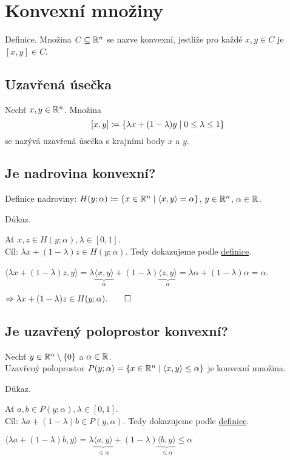 \section{Konvexní množiny} \label{sec:konvex}
Definice. Množina $C \subseteq \mathbb{R}^n$ se nazve konvexní, jestliže pro každé $x, y \in C$ je $[x,y] \in C$.

\subsection{Uzavřená úsečka}
Nechť $x, y \in \mathbb{R}^n$. Množina
\[ [x,y] \coloneq \left\lbrace \lambda x + (1-\lambda)y \mid 0 \leq \lambda \leq 1 \right\rbrace \]
se nazývá uzavřená úsečka s krajními body $x$ a $y$.

\subsection{Je nadrovina konvexní?}
Definice nadroviny: $H(y; \alpha) \coloneq \left\lbrace x \in \mathbb{R}^n \mid \langle x, y \rangle = \alpha \right\rbrace$, $y \in \mathbb{R}^n$, 
$\alpha \in \mathbb{R}$.

Důkaz.

Ať $x,z \in H(y; \alpha), \lambda \in [0,1]$.\\
Cíl: $\lambda x + (1-\lambda) z \in H(y; \alpha)$. Tedy dokazujeme podle \hyperref[sec:konvex]{definice}.

$\langle \lambda x + (1-\lambda)z, y \rangle = \lambda \underbrace{\langle x,y \rangle}_{\alpha} + (1-\lambda)
\underbrace{\langle z,y \rangle}_{\alpha} = \lambda \alpha + (1-\lambda) \alpha = \alpha$.

$\Rightarrow \lambda x + (1-\lambda)z \in H(y; \alpha). \qed$

\subsection{Je uzavřený poloprostor konvexní?}
Nechť $y \in \mathbb{R}^n \setminus \left\lbrace 0 \right\rbrace$ a $\alpha \in \mathbb{R}$. \\ Uzavřený poloprostor 
$P(y; \alpha) = \left\lbrace x \in \mathbb{R}^n \mid \langle x, y\rangle \leq \alpha \right\rbrace$ je konvexní množina.

Důkaz.

Ať $a,b \in P(y; \alpha), \lambda \in [0,1]$.\\
Cíl: $\lambda a + (1-\lambda) b \in P(y, \alpha)$. Tedy dokazujeme podle \hyperref[sec:konvex]{definice}.

$\langle \lambda a + (1-\lambda)b, y\rangle = \lambda \underbrace{\langle a, y\rangle}_{\leq \alpha} + 
(1-\lambda)\underbrace{\langle b, y\rangle}_{\leq \alpha} \leq \alpha$


